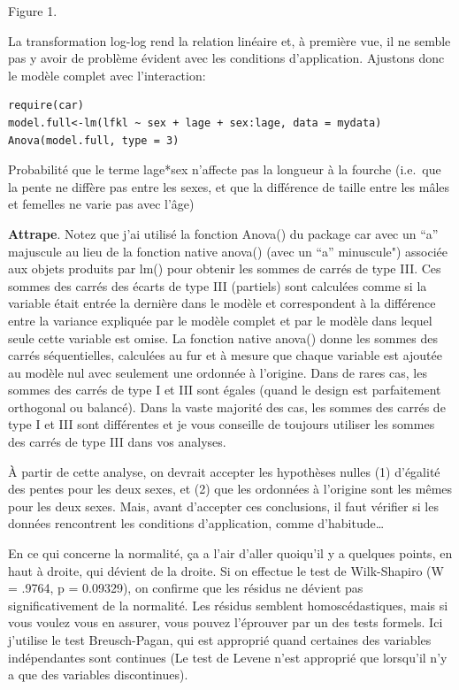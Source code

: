 \documentclass[12pt,]{book}
\begin{document}
Figure 1.

La transformation log-log rend la relation linéaire et, à première vue, il
ne semble pas y avoir de problème évident avec les conditions
d'application. Ajustons donc le modèle complet avec l'interaction:

\begin{verbatim}
require(car)
model.full<-lm(lfkl ~ sex + lage + sex:lage, data = mydata)
Anova(model.full, type = 3)
\end{verbatim}

Probabilité que le terme lage*sex n'affecte pas la longueur à la
fourche (i.e.~que la pente ne diffère pas entre les sexes, et que la
différence de taille entre les mâles et femelles ne varie pas avec l'âge)

\textbf{Attrape}. Notez que j'ai utilisé la fonction Anova() du package car avec
un ``a'' majuscule au lieu de la fonction native anova() (avec un ``a''
minuscule") associée aux objets produits par lm() pour obtenir les
sommes de carrés de type III. Ces sommes des carrés des écarts de
type III (partiels) sont calculées comme si la variable était entrée la
dernière dans le modèle et correspondent à la différence entre la
variance expliquée par le modèle complet et par le modèle dans lequel
seule cette variable est omise. La fonction native anova() donne les
sommes des carrés séquentielles, calculées au fur et à mesure que
chaque variable est ajoutée au modèle nul avec seulement une
ordonnée à l'origine. Dans de rares cas, les sommes des carrés de type
I et III sont égales (quand le design est parfaitement orthogonal ou
balancé). Dans la vaste majorité des cas, les sommes des carrés de type
I et III sont différentes et je vous conseille de toujours utiliser les
sommes des carrés de type III dans vos analyses.

À partir de cette analyse, on devrait accepter les hypothèses nulles (1)
d'égalité des pentes pour les deux sexes, et (2) que les ordonnées à
l'origine sont les mêmes pour les deux sexes. Mais, avant d'accepter
ces conclusions, il faut vérifier si les données rencontrent les
conditions d'application, comme d'habitude\ldots{}

En ce qui concerne la normalité, ça a l'air d'aller quoiqu'il
y a quelques points, en haut à droite, qui dévient de la
droite. Si on effectue le test de Wilk-Shapiro (W = .9764, p
= 0.09329), on confirme que les résidus ne dévient pas significativement de la normalité. Les résidus semblent homoscédastiques, mais si vous voulez vous en assurer, vous
pouvez l'éprouver par un des tests formels. Ici j'utilise le
test Breusch-Pagan, qui est approprié quand certaines des
variables indépendantes sont continues (Le test de Levene
n'est approprié que lorsqu'il n'y a que des variables discontinues).
\end{document}
